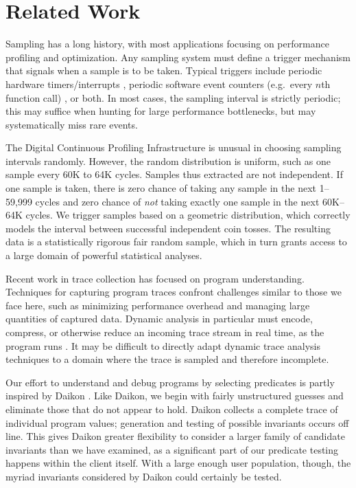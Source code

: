 \section{Related Work}
\label{sec:related-work}

Sampling has a long history, with most applications focusing on
performance profiling and optimization.  Any sampling system must
define a trigger mechanism that signals when a sample is to be taken.
Typical triggers include periodic hardware timers/interrupts
\cite{Burrows:2000:EFV,Traub:200:EILPP,Whaley:337483}, periodic
software event counters (e.g.\ every $n$th function call)
\cite{Arnold:2000:ACCTS}, or both.  In most cases, the sampling
interval is strictly periodic; this may suffice when hunting for large
performance bottlenecks, but may systematically miss rare events.

The Digital Continuous Profiling Infrastructure
\cite{Anderson:1997:CPW} is unusual in choosing sampling intervals
randomly.  However, the random distribution is uniform, such as one
sample every 60K to 64K cycles.  Samples thus extracted are not
independent.  If one sample is taken, there is zero chance of taking
any sample in the next 1--59,999 cycles and zero chance of \emph{not}
taking exactly one sample in the next 60K--64K cycles.  We trigger
samples based on a geometric distribution, which correctly models the
interval between successful independent coin tosses.  The resulting data is a
statistically rigorous fair random sample, which in turn grants access
to a large domain of powerful statistical analyses.

Recent work in trace collection has focused on program understanding.
Techniques for capturing program traces confront challenges similar to
those we face here, such as minimizing performance overhead and
managing large quantities of captured data.  Dynamic analysis in
particular must encode, compress, or otherwise reduce an incoming
trace stream in real time, as the program runs
\cite{Demsky:RBEOOP:2002,ICSE01*221}.  It may be difficult to directly
adapt dynamic trace analysis techniques to a domain where the trace is
sampled and therefore incomplete.  

Our effort to understand and debug programs by selecting predicates is
partly inspired by Daikon \cite{ernst2001}.  Like Daikon, we begin
with fairly unstructured guesses and eliminate those that do not
appear to hold.  Daikon collects a complete trace of individual
program values; generation and testing of possible invariants occurs
off line.  This gives Daikon greater flexibility to consider a
larger family of candidate invariants than we have examined, as a
significant part of our predicate testing happens within the client
itself.  With a large enough user population, though, the myriad
invariants considered by Daikon could certainly be tested.

